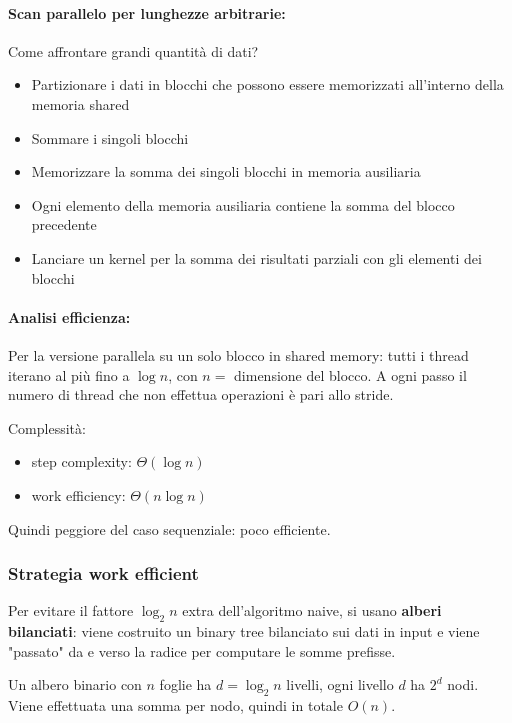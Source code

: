 \paragraph{Scan parallelo per lunghezze arbitrarie:} Come affrontare grandi quantità di dati? 
\begin{itemize}
    \item Partizionare i dati in blocchi che possono essere memorizzati all'interno della memoria shared
    
    \item Sommare i singoli blocchi 
    
    \item Memorizzare la somma dei singoli blocchi in memoria ausiliaria
    
    \item Ogni elemento della memoria ausiliaria contiene la somma del blocco precedente
    
    \item Lanciare un kernel per la somma dei risultati parziali con gli elementi dei blocchi
\end{itemize}

\paragraph{Analisi efficienza:} Per la versione parallela su un solo blocco in shared memory: tutti i thread iterano al più fino a $\log n$, con $n =$ dimensione del blocco. A ogni passo il numero di thread che non effettua operazioni è pari allo stride.

Complessità: 
\begin{itemize}
    \item step complexity: $\Theta (\log n)$
    \item work efficiency: $\Theta (n \log n)$
\end{itemize}

Quindi peggiore del caso sequenziale: poco efficiente.

\subsubsection{Strategia work efficient}

Per evitare il fattore $\log_2 n$ extra dell'algoritmo naive, si usano \textbf{alberi bilanciati}: viene costruito un binary tree bilanciato sui dati in input e viene "passato" da e verso la radice per computare le somme prefisse.

Un albero binario con $n$ foglie ha $d = \log_2 n$ livelli, ogni livello $d$ ha $2^d$ nodi. Viene effettuata una somma per nodo, quindi in totale $O(n)$.

